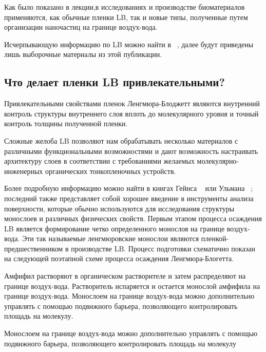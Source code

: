 \documentclass[11pt]{article}
\begin{document}
Как было показано в лекции,в исследованиях и производстве биоматериалов применяются, как обычные пленки LB, так и новые типы, полученные путем организации наночастиц на границе воздух-вода. 

Исчерпывающую информацию по LB можно найти в ~\cite{Handbook}, далее будут приведены лишь выборочные материалы из этой публикации.

\subsection{Что делает пленки LB привлекательными?}  
Привлекательными свойствами пленок Ленгмюра-Блоджетт являются внутренний контроль структуры внутреннего слоя вплоть до молекулярного уровня и точный контроль толщины полученной пленки.

Сложные желоба LB позволяют нам обрабатывать несколько материалов с различными функциональными возможностями и дают возможность настраивать архитектуру слоев в соответствии с требованиями желаемых молекулярно-инженерных органических тонкопленочных устройств. 

Более подробную информацию можно найти в книгах Гейнса ~\cite{c4} или Ульмана ~\cite{c5}; последний также представляет собой хорошее введение в инструменты анализа поверхности, которые обычно используются для исследования структуры монослоев и различных физических свойств.
Первым этапом процесса осаждения LB является формирование четко определенного монослоя на границе воздух-вода. Эти так называемые ленгмюровские монослои являются пленкой-предшественником в производстве LB. Процесс подготовки схематично показан на следующей
 поэтапной схеме процесса осаждения Ленгмюра-Блогетта. 
 
 Амфифил растворяют в органическом растворителе и затем распределяют на границе воздух-вода. Растворитель испаряется и остается монослой амфифила на границе воздух-вода. Монослоем на границе воздух-вода можно дополнительно управлять с помощью подвижного барьера, позволяющего контролировать площадь на молекулу.

    \begin{center}
    \end{center}    

Монослоем на границе воздух-вода можно дополнительно управлять с помощью подвижного барьера, позволяющего контролировать площадь на молекулу

    \begin{center}
    \end{center}    
\end{document}
